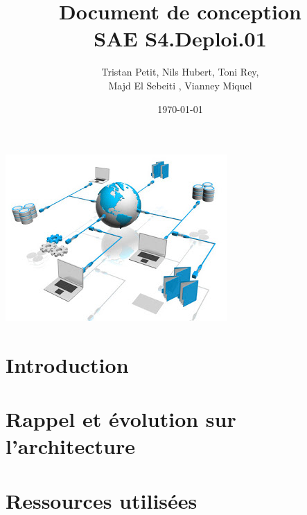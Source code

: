 \documentclass{article}
\begin{document}
\title{Document de conception \\ SAE S4.Deploi.01}
\author{Tristan Petit, Nils Hubert, Toni Rey,\\ 
 Majd El Sebeiti , Vianney Miquel}
\date{\today}
\maketitle
\begin{center}
    \vspace{1cm} %
    \includegraphics{Images/Logo-project.jpeg} %
\end{center}

\maketitle

\newpage
\renewcommand{\contentsname}{Table des matières}

\tableofcontents

\newpage
{}

\section{Introduction}



\section{Rappel et évolution sur l'architecture}



\section{Ressources utilisées}
\end{document}
